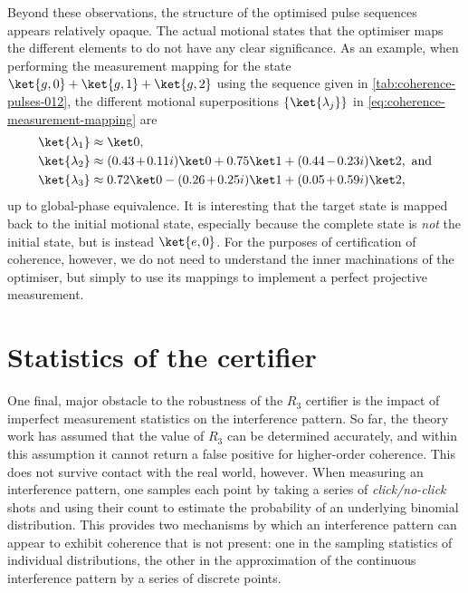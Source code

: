 Beyond these observations, the structure of the optimised pulse sequences appears relatively opaque.
The actual motional states that the optimiser maps the different elements to do not have any clear significance.
As an example, when performing the measurement mapping for the state $\ket{g,0} + \ket{g,1} + \ket{g,2}$ using the sequence given in \cref{tab:coherence-pulses-012}, the different motional superpositions $\{\ket{\lambda_j}\}$ in \cref{eq:coherence-measurement-mapping} are
\begin{equation}\begin{aligned}
\ket{\lambda_1} &\approx \ket0,\\
\ket{\lambda_2} &\approx \msquash{(0.43 + 0.11i)}\ket0 + 0.75\ket1 + \msquash{(0.44-0.23i)}\ket2,\ \text{and}\\
\ket{\lambda_3} &\approx 0.72\ket0 - \msquash{(0.26+0.25i)}\ket1 + \msquash{(0.05+0.59i)}\ket2,
\end{aligned}\end{equation}
up to global-phase equivalence.
It is interesting that the target state is mapped back to the initial motional state, especially because the complete state is \emph{not} the initial state, but is instead $\ket{e,0}$.
For the purposes of certification of coherence, however, we do not need to understand the inner machinations of the optimiser, but simply to use its mappings to implement a perfect projective measurement.


\section{Statistics of the certifier}

One final, major obstacle to the robustness of the $R_3$ certifier is the impact of imperfect measurement statistics on the interference pattern.
So far, the theory work has assumed that the value of $R_3$ can be determined accurately, and within this assumption it cannot return a false positive for higher-order coherence.
This does not survive contact with the real world, however.
When measuring an interference pattern, one samples each point by taking a series of \emph{click/no-click} shots and using their count to estimate the probability of an underlying binomial distribution.
This provides two mechanisms by which an interference pattern can appear to exhibit coherence that is not present: one in the sampling statistics of individual distributions, the other in the approximation of the continuous interference pattern by a series of discrete points.

